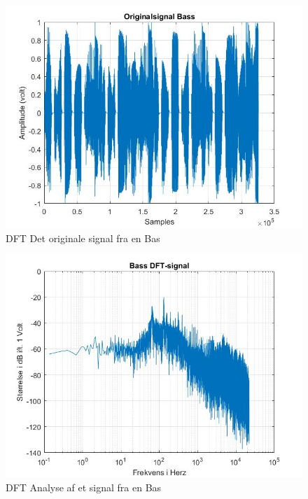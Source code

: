 \begin{figure}[ht!]
	\centering
	\includegraphics[width=180mm]{figures/Bass/original.jpg}
	\caption{DFT Det originale signal fra en Bas}
	\label{fig:Bas original}
\end{figure}

\begin{figure}[ht!]
	\centering
	\includegraphics[width=180mm]{figures/Bass/DFT.jpg}
	\caption{DFT Analyse af et signal fra en Bas}
	\label{fig:Bas DFT}
\end{figure}

